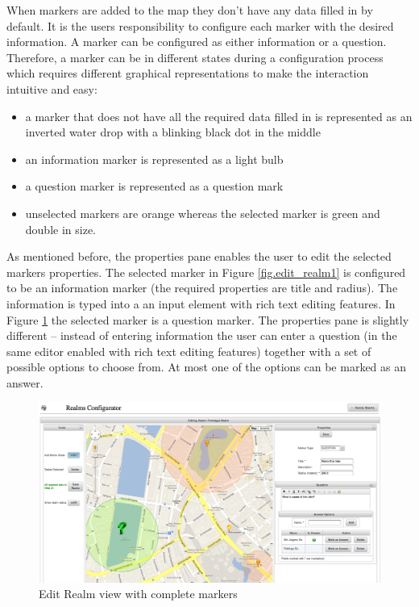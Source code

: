 \noindent When markers are added to the map they don't have any data filled in by default. It is the users responsibility to configure each marker with the desired information. A marker can be configured as either information or a question. Therefore, a marker can be in different states during a configuration process which requires different graphical representations to make the interaction intuitive and easy:
\begin{itemize}
	\item a marker that does not have all the required data filled in is represented as an inverted water drop with a blinking black dot in the middle
	\item an information marker is represented as a light bulb
	\item a question marker is represented as a question mark
	\item unselected markers are orange whereas the selected marker is green and double in size.
\end{itemize}

\noindent As mentioned before, the properties pane enables the user to edit the selected markers properties. The selected marker in Figure \ref{fig.edit_realm1} is configured to be an information marker (the required properties are title and radius). The information is typed into a an input element with rich text editing features. In Figure \ref{fig.edit_realm2} the selected marker is a question marker. The properties pane is slightly different -- instead of entering information the user can enter a question (in the same editor enabled with rich text editing features) together with a set of possible options to choose from. At most one of the options can be marked as an answer.
\begin{figure}[H] 
	\centering
	\includegraphics[width=\linewidth]{fig/edit_realm2.png}
	\caption{Edit Realm view with complete markers}
	\label{fig.edit_realm2}
\end{figure}

